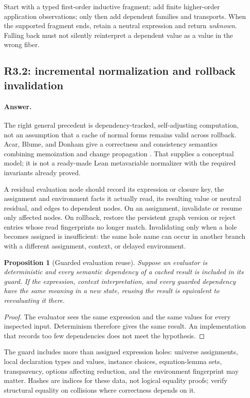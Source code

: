 \documentclass[11pt,a4paper]{article}
\newcommand{\answer}{\paragraph{Answer.}}
\newtheorem{proposition}{Proposition}[section]
\theoremstyle{definition}
\theoremstyle{remark}
\begin{document}
Start with a typed first-order inductive fragment; add finite higher-order
application observations; only then add dependent families and transports.
When the supported fragment ends, retain a neutral expression and return
\emph{unknown}. Falling back must not silently reinterpret a dependent value as
a value in the wrong fiber.

\subsection{R3.2: incremental normalization and rollback invalidation}
\answer The right general precedent is dependency-tracked, self-adjusting
computation, not an assumption that a cache of normal forms remains valid
across rollback. Acar, Blume, and Donham give a correctness and consistency
semantics combining memoization and change propagation \cite{selfadjust}.
That supplies a conceptual model; it is not a ready-made Lean metavariable
normalizer with the required invariants already proved.

A residual evaluation node should record its expression or closure key, the
assignment and environment facts it actually read, its resulting value or
neutral residual, and edges to dependent nodes. On an assignment, invalidate or
resume only affected nodes. On rollback, restore the persistent graph version
or reject entries whose read fingerprints no longer match. Invalidating only
when a hole becomes assigned is insufficient: the same hole name can occur in
another branch with a different assignment, context, or delayed environment.

\begin{proposition}[Guarded evaluation reuse]\label{prop:cache}
Suppose an evaluator is deterministic and every semantic dependency of a cached
result is included in its guard. If the expression, context interpretation,
and every guarded dependency have the same meaning in a new state, reusing the
result is equivalent to reevaluating it there.
\end{proposition}
\begin{proof}
The evaluator sees the same expression and the same values for every inspected
input. Determinism therefore gives the same result. An implementation that
records too few dependencies does not meet the hypothesis.
\end{proof}

The guard includes more than assigned expression holes: universe assignments,
local declaration types and values, instance choices, equation-lemma sets,
transparency, options affecting reduction, and the environment fingerprint may
matter. Hashes are indices for these data, not logical equality proofs; verify
structural equality on collisions where correctness depends on it.
\end{document}
